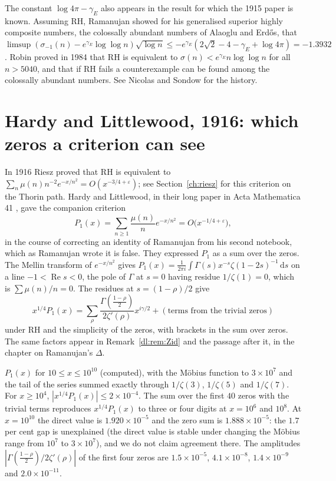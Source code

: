 The constant $\log4\pi-\gamma_E$ also appears in the result for which the 1915 paper is known. Assuming RH, Ramanujan showed for his generalised superior highly composite numbers, the colossally abundant numbers of Alaoglu and Erd\H{o}s, that $\limsup(\sigma_{-1}(n)-e^{\gamma_E}\log\log n)\sqrt{\log n}\le-e^{\gamma_E}(2\sqrt2-4-\gamma_E+\log4\pi)=-1.3932$. Robin proved in 1984 \cite{Robin84} that RH is equivalent to $\sigma(n)<e^{\gamma_E}n\log\log n$ for all $n>5040$, and that if RH fails a counterexample can be found among the colossally abundant numbers. See Nicolas and Sondow \cite{Nicolas12} for the history.

\section{Hardy and Littlewood, 1916: which zeros a criterion can see}\label{cl:sec:hl}

In 1916 Riesz proved \cite{Riesz16} that RH is equivalent to $\sum_n\mu(n)n^{-2}e^{-x/n^2}=O(x^{-3/4+\varepsilon})$; see Section~\ref{ch:riesz} for this criterion on the Thorin path. Hardy and Littlewood, in their long paper in Acta Mathematica 41 \cite{HL16}, gave the companion criterion
\[
P_1(x)=\sum_{n\ge1}\frac{\mu(n)}ne^{-x/n^2}=O\bigl(x^{-1/4+\varepsilon}\bigr),
\]
in the course of correcting an identity of Ramanujan from his second notebook, which as Ramanujan wrote it is false. They expressed $P_1$ as a sum over the zeros. The Mellin transform of $e^{-x/n^2}$ gives $P_1(x)=\frac1{2\pi i}\int\Gamma(s)x^{-s}\zeta(1-2s)^{-1}\,\mathrm{d}s$ on a line $-1<\operatorname{Re}s<0$, the pole of $\Gamma$ at $s=0$ having residue $1/\zeta(1)=0$, which is $\sum\mu(n)/n=0$. The residues at $s=(1-\rho)/2$ give
\[
x^{1/4}P_1(x)=\sum_\rho\frac{\Gamma(\frac{1-\rho}2)}{2\zeta'(\rho)}x^{i\gamma/2}+(\text{terms from the trivial zeros})
\]
under RH and the simplicity of the zeros, with brackets in the sum over zeros. The same factors appear in Remark~\ref{dl:rem:Zid} and the passage after it, in the chapter on Ramanujan's $\Delta$.

\begin{computation}\label{cl:comp:riesz}
$P_1(x)$ for $10\le x\le10^{10}$ (computed), with the M\"obius function to $3\times10^7$ and the tail of the series summed exactly through $1/\zeta(3)$, $1/\zeta(5)$ and $1/\zeta(7)$. For $x\ge10^4$, $|x^{1/4}P_1(x)|\le2\times10^{-4}$. The sum over the first $40$ zeros with the trivial terms reproduces $x^{1/4}P_1(x)$ to three or four digits at $x=10^6$ and $10^8$. At $x=10^{10}$ the direct value is $1.920\times10^{-5}$ and the zero sum is $1.888\times10^{-5}$: the $1.7$ per cent gap is unexplained (the direct value is stable under changing the M\"obius range from $10^7$ to $3\times10^7$), and we do not claim agreement there. The amplitudes $|\Gamma(\frac{1-\rho}2)/2\zeta'(\rho)|$ of the first four zeros are $1.5\times10^{-5}$, $4.1\times10^{-8}$, $1.4\times10^{-9}$ and $2.0\times10^{-11}$.
\end{computation}

